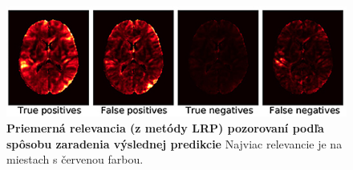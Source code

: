 \begin{figure}[h!]
\centering
\includegraphics[scale=0.4]{assets/images/lrp_alzheimer.png}
\caption{\textbf{Priemerná relevancia (z metódy LRP) pozorovaní podľa spôsobu zaradenia výslednej predikcie}
Najviac relevancie je na miestach s červenou farbou.
}
\label{fig:lrp_alzheimer}
\end{figure}





